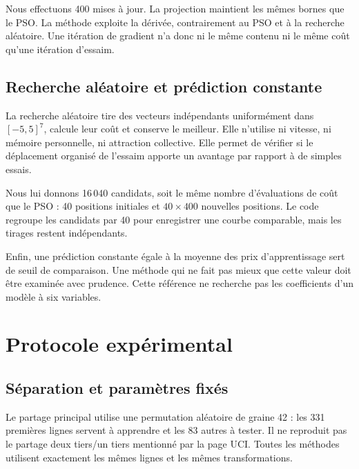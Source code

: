 \documentclass[conference,a4paper]{IEEEtran}
\begin{document}
Nous effectuons 400 mises à jour. La projection maintient les mêmes bornes que le PSO. La méthode exploite la dérivée, contrairement au PSO et à la recherche aléatoire. Une itération de gradient n'a donc ni le même contenu ni le même coût qu'une itération d'essaim.

\subsection{Recherche aléatoire et prédiction constante}
La recherche aléatoire tire des vecteurs indépendants uniformément dans $[-5,5]^7$, calcule leur coût et conserve le meilleur. Elle n'utilise ni vitesse, ni mémoire personnelle, ni attraction collective. Elle permet de vérifier si le déplacement organisé de l'essaim apporte un avantage par rapport à de simples essais.

Nous lui donnons 16\,040 candidats, soit le même nombre d'évaluations de coût que le PSO : 40 positions initiales et $40\times400$ nouvelles positions. Le code regroupe les candidats par 40 pour enregistrer une courbe comparable, mais les tirages restent indépendants.

Enfin, une prédiction constante égale à la moyenne des prix d'apprentissage sert de seuil de comparaison. Une méthode qui ne fait pas mieux que cette valeur doit être examinée avec prudence. Cette référence ne recherche pas les coefficients d'un modèle à six variables.

\section{Protocole expérimental}
\subsection{Séparation et paramètres fixés}
Le partage principal utilise une permutation aléatoire de graine 42 : les 331 premières lignes servent à apprendre et les 83 autres à tester. Il ne reproduit pas le partage deux tiers/un tiers mentionné par la page UCI. Toutes les méthodes utilisent exactement les mêmes lignes et les mêmes transformations.
\end{document}
